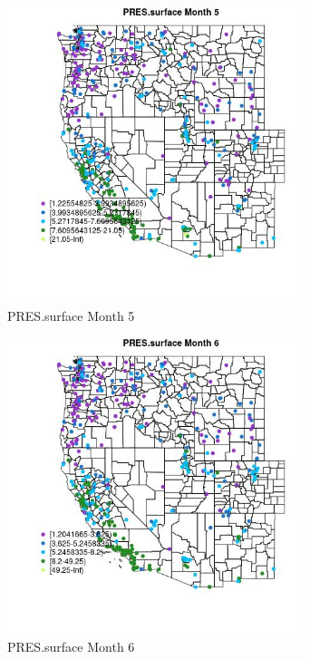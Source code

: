 \begin{figure} 
\centering  
\includegraphics[width=0.77\textwidth]{Code_Outputs/ML_input_report_ML_input_PM25_Step5_part_d_de_duplicated_aves_ML_input_MapObsMo5PRESsurface.jpg} 
\caption{\label{fig:ML_input_report_ML_input_PM25_Step5_part_d_de_duplicated_aves_ML_inputMapObsMo5PRESsurface}PRES.surface Month 5} 
\end{figure} 
 

\begin{figure} 
\centering  
\includegraphics[width=0.77\textwidth]{Code_Outputs/ML_input_report_ML_input_PM25_Step5_part_d_de_duplicated_aves_ML_input_MapObsMo6PRESsurface.jpg} 
\caption{\label{fig:ML_input_report_ML_input_PM25_Step5_part_d_de_duplicated_aves_ML_inputMapObsMo6PRESsurface}PRES.surface Month 6} 
\end{figure} 
 

